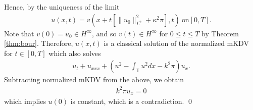 \documentclass[12pt,reqno]{amsart}
\numberwithin{equation}{section}  %
\newcommand{\ci}{\mathbb{T}}
\begin{document}
%
%
Hence, by the uniqueness of the limit
%
%
\begin{equation*}
\begin{split}
  u(x,t) = v(x + t [\|u_{0}  \|_{L^{2}}^{2} + \kappa^{2} \pi],t) \ \text{on} \left[
  0,T \right].
\end{split}
\end{equation*}
%
%
Note that $v(0) = u_{0} \in H^{\infty}$, and so $v(t) \in H^{\infty}$ for
$0 \le t \le T$ by Theorem \ref{thm:bour}. Therefore, $u(x,t)$ is a classical solution of the normalized mKDV for $t \in
[0,T]$ which also solves
%
%
\begin{equation*}
\begin{split}
  u_{t} + u_{xxx} + \left( u^{2} - \int_{\ci} u^{2} dx  - k^{2} \pi
  \right)u_{x}.
\end{split}
\end{equation*}
%
%
Subtracting normalized mKDV from the above, we obtain
%
%
\begin{equation*}
\begin{split}
  k^{2} \pi u_{x} = 0
\end{split}
\end{equation*}
%
%
which implies $u(0)$ is constant, which is a contradiction. \qed
    

\appendix
\end{document}
